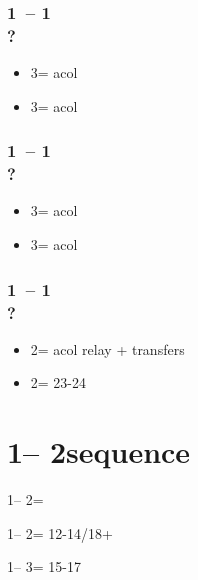 \documentclass[12pt, a4paper]{report}
\begin{document}
\begin{bidpage}
\subsubsection*{1\clubs\ -- 1\hearts\\
                ?}
\begin{itemize}
    \item 3\clubs = acol \diams
    \item 3\diams = acol \spades
\end{itemize}
\end{bidpage}

\begin{bidpage}
\subsubsection*{1\clubs\ -- 1\spades\\
                ?}
\begin{itemize}
    \item 3\clubs = acol \diams
    \item 3\diams = acol \hearts
\end{itemize}
\end{bidpage}

\begin{bidpage}
\subsubsection*{1\clubs\ -- 1\nt\\
                ?}
\begin{itemize}
    \item 2\major = acol \major \then relay + transfers
    \item 2\nt = 23-24 \bal
\end{itemize}
\end{bidpage}

\section{1\clubs -- 2\clubs sequence}

1\clubs -- 2\clubs = \nat\ \gf

1\clubs -- 2\nt = 12-14/18+ \bal

1\clubs -- 3\nt = 15-17

\vspace{1cm}
\end{document}
